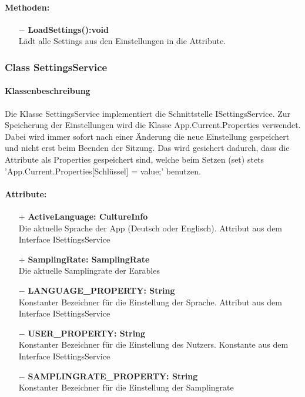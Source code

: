 \documentclass[a4paper,12pt]{article}
\begin{document}
	\paragraph{Methoden:}
	\begin{itemize}
		\item[$-$] \textbf{LoadSettings():void}\\Lädt alle Settings aus den Einstellungen in die Attribute.	
	\end{itemize}
\subsubsection{Class SettingsService}
	\paragraph{Klassenbeschreibung}
	Die Klasse SettingsService implementiert die Schnittstelle ISettingsService. Zur Speicherung der Einstellungen wird die Klasse App.Current.Properties verwendet.
	Dabei wird immer sofort nach einer Änderung die neue Einstellung gespeichert und nicht erst beim Beenden der Sitzung.
	Das wird gesichert dadurch, dass die Attribute als Properties gespeichert sind, welche beim Setzen (set) stets 'App.Current.Properties[Schlüssel] = value;' benutzen.
	\paragraph{Attribute:}
	\begin{itemize}
		\item[+] \textbf{ActiveLanguage: CultureInfo}\\Die aktuelle Sprache der App (Deutsch oder Englisch). Attribut aus dem Interface ISettingsService\\
		\item[+] \textbf{SamplingRate: SamplingRate}\\Die aktuelle Samplingrate der \Gls{Earables} \\ 
		\item[$-$] \textbf{LANGUAGE\_PROPERTY: String}\\Konstanter Bezeichner für die Einstellung der Sprache. Attribut aus dem Interface ISettingsService \\
		\item[$-$] \textbf{USER\_PROPERTY: String}\\Konstanter Bezeichner für die Einstellung des Nutzers. Konstante aus dem Interface ISettingsService \\
		\item[$-$] \textbf{SAMPLINGRATE\_PROPERTY: String}\\Konstanter Bezeichner für die Einstellung der Samplingrate \\
	\end{itemize}
\end{document}
